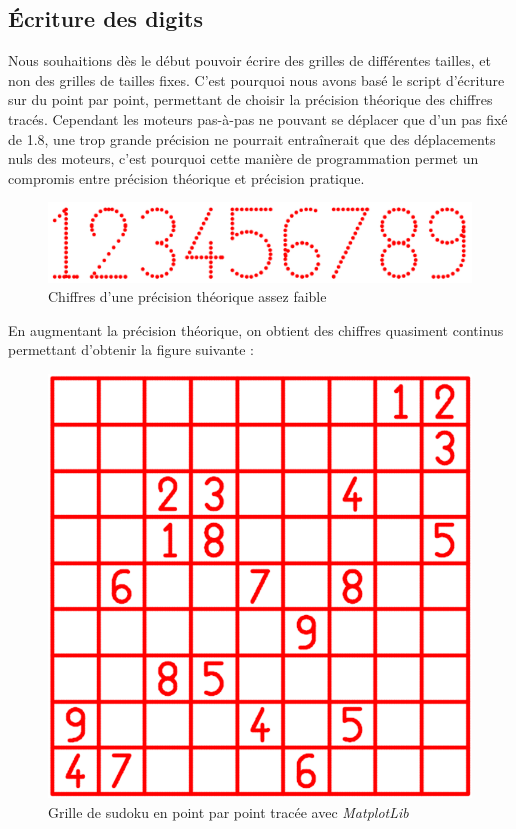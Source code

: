 \documentclass[12pt,a4paper]{report}
\begin{document}
\subsection*{Écriture des digits}
Nous souhaitions dès le début pouvoir écrire des grilles de différentes tailles, et non des grilles de tailles fixes. C'est pourquoi nous avons basé le script d'écriture sur du point par point, permettant de choisir la précision théorique des chiffres tracés. Cependant les moteurs pas-à-pas ne pouvant se déplacer que d'un pas fixé de 1.8\degre, une trop grande précision ne pourrait entraînerait que des déplacements nuls des moteurs, c'est pourquoi cette manière de programmation permet un compromis entre précision théorique et précision pratique.
\begin{figure}[!h]
 \center
 \includegraphics[scale=0.35]{../pictures/numbers}
 \caption{Chiffres d'une précision théorique assez faible}
\end{figure}
\newpage
En augmentant la précision théorique, on obtient des chiffres quasiment continus permettant d'obtenir la figure suivante :

\begin{figure}[!h]
 \center
 \includegraphics[scale=0.45]{../pictures/Sudoku_points}
 \caption{Grille de sudoku en point par point tracée avec \emph{MatplotLib}}
\end{figure}
\end{document}
